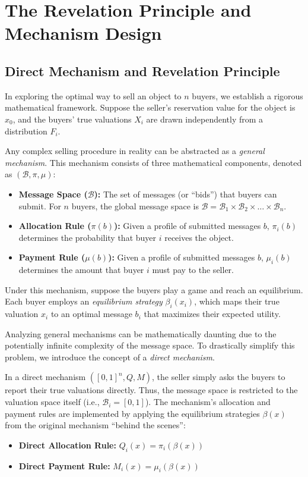 \chapter{The Revelation Principle and Mechanism Design}

\section{Direct Mechanism and Revelation Principle}

In exploring the optimal way to sell an object to $n$ buyers, we establish a rigorous mathematical framework. Suppose the seller's reservation value for the object is $x_0$, and the buyers' true valuations $X_i$ are drawn independently from a distribution $F_i$.

Any complex selling procedure in reality can be abstracted as a \textit{general mechanism}. This mechanism consists of three mathematical components, denoted as $(\mathcal{B}, \pi, \mu)$:
\begin{itemize}
    \item \textbf{Message Space ($\mathcal{B}$):} The set of messages (or ``bids'') that buyers can submit. For $n$ buyers, the global message space is $\mathcal{B} = \mathcal{B}_1 \times \mathcal{B}_2 \times \dots \times \mathcal{B}_n$.
    \item \textbf{Allocation Rule ($\pi(b)$):} Given a profile of submitted messages $b$, $\pi_i(b)$ determines the probability that buyer $i$ receives the object.
    \item \textbf{Payment Rule ($\mu(b)$):} Given a profile of submitted messages $b$, $\mu_i(b)$ determines the amount that buyer $i$ must pay to the seller.
\end{itemize}
Under this mechanism, suppose the buyers play a game and reach an equilibrium. Each buyer employs an \textit{equilibrium strategy} $\beta_i(x_i)$, which maps their true valuation $x_i$ to an optimal message $b_i$ that maximizes their expected utility.

Analyzing general mechanisms can be mathematically daunting due to the potentially infinite complexity of the message space. To drastically simplify this problem, we introduce the concept of a \textit{direct mechanism}.

In a direct mechanism $([0,1]^n, Q, M)$, the seller simply asks the buyers to report their true valuations directly. Thus, the message space is restricted to the valuation space itself (i.e., $\mathcal{B}_i = [0,1]$). The mechanism's allocation and payment rules are implemented by applying the equilibrium strategies $\beta(x)$ from the original mechanism ``behind the scenes'':
\begin{itemize}
    \item \textbf{Direct Allocation Rule:} $Q_i(x) = \pi_i(\beta(x))$
    \item \textbf{Direct Payment Rule:} $M_i(x) = \mu_i(\beta(x))$
\end{itemize}

